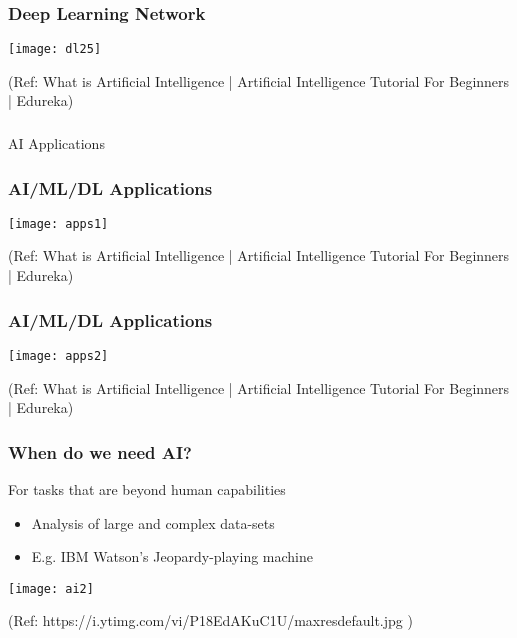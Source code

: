 \begin{frame}[fragile]\frametitle{Deep Learning Network}
\begin{center}
\texttt{[image: dl25]}
\end{center}

{\tiny (Ref:  What is Artificial Intelligence | Artificial Intelligence Tutorial For Beginners | Edureka)}
\end{frame}

\begin{frame}[fragile]\frametitle{}
\begin{center}
{\Large AI Applications}
\end{center}
\end{frame}


\begin{frame}[fragile]\frametitle{AI/ML/DL Applications}
\begin{center}
\texttt{[image: apps1]}
\end{center}

{\tiny (Ref:  What is Artificial Intelligence | Artificial Intelligence Tutorial For Beginners | Edureka)}
\end{frame}

\begin{frame}[fragile]\frametitle{AI/ML/DL Applications}
\begin{center}
\texttt{[image: apps2]}
\end{center}

{\tiny (Ref:  What is Artificial Intelligence | Artificial Intelligence Tutorial For Beginners | Edureka)}
\end{frame}



\begin{frame}[fragile]\frametitle{When do we need AI?}
For tasks that are beyond human capabilities 
\begin{itemize}
\item Analysis of large and complex data-sets 
\item E.g. IBM Watson's Jeopardy-playing machine
\end{itemize}
\begin{center}
\texttt{[image: ai2]}
\end{center}
{\tiny (Ref:  https://i.ytimg.com/vi/P18EdAKuC1U/maxresdefault.jpg )}
\end{frame}

